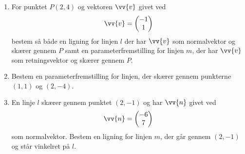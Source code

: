 \begin{enumerate}[label=\roman*)]
	\item For punktet $P(2,4)$ og vektoren $\vv{v}$ givet ved
	\begin{align*}
		\vv{v} = 
		\begin{pmatrix}
			-1\\1
		\end{pmatrix}
	\end{align*}
	bestem så både en ligning for linjen $l$ der har $\vv{v}$ som normalvektor og skærer
	gennem $P$ samt en parameterfremstilling for linjen $m$, der har $\vv{v}$ som 
	retningsvektor og skærer gennem $P$.
	\item Bestem en parameterfremstilling for linjen, der skærer gennem punkterne $(1,1)$ og
	$ (2,-4)$.
	\item En linje $l$ skærer gennem punktet $(2,-1)$ og har $\vv{n}$ givet ved
	\begin{align*}
		\vv{n} = 
		\begin{pmatrix}
			-6\\7
		\end{pmatrix}	
	\end{align*}
	som normalvektor. Bestem en ligning for linjen $m$, der går gennem $(2,-1)$ og står 
	vinkelret på $l$. 
\end{enumerate}

